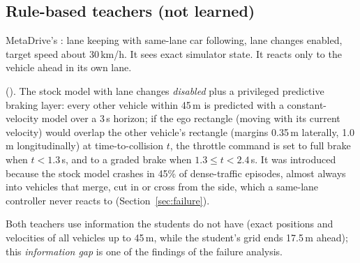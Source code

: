 \subsection{Rule-based teachers (not learned)}\label{sec:teachers}
\begin{description}[leftmargin=3.4cm,style=nextline]
\item[Stock intelligent driver model] MetaDrive's : lane keeping with same-lane car following, lane changes enabled, target speed about 30\,km/h. It sees exact simulator state. It reacts only to the vehicle ahead in its own lane.
\item[Collision-aware teacher]  (). The stock model with lane changes \emph{disabled} plus a privileged predictive braking layer: every other vehicle within 45\,m is predicted with a constant-velocity model over a 3\,s horizon;
 if the ego rectangle (moving with its current velocity) would overlap the other vehicle's rectangle (margins 0.35\,m laterally, 1.0\,m longitudinally) at time-to-collision $t$, the throttle command is set to full brake when $t<1.3$\,s, and to a graded brake when $1.3\le t<2.4$\,s.
 It was introduced because the stock model crashes in 45\% of dense-traffic episodes, almost always into vehicles that merge, cut in or cross from the side, which a same-lane controller never reacts to (Section~\ref{sec:failure}).
\end{description}
Both teachers use information the students do not have (exact positions and velocities of all vehicles up to 45\,m, while the student's grid ends 17.5\,m ahead); this \emph{information gap} is one of the findings of the failure analysis.
